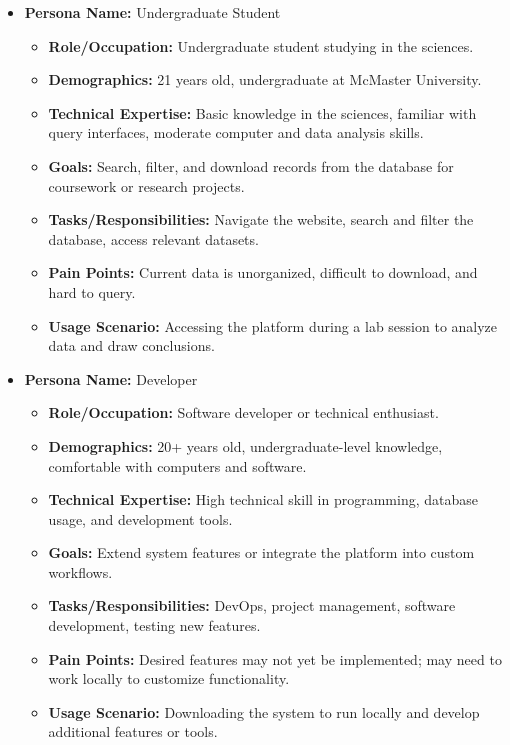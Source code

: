 \documentclass[12pt]{article}
\begin{document}
\begin{itemize}
    \item \textbf{Persona Name:} Undergraduate Student
    \begin{itemize}
        \item \textbf{Role/Occupation:} Undergraduate student studying in the sciences.
        \item \textbf{Demographics:} 21 years old, undergraduate at McMaster University.
        \item \textbf{Technical Expertise:} Basic knowledge in the sciences, familiar with query interfaces, moderate computer and data analysis skills.
        \item \textbf{Goals:} Search, filter, and download records from the database for coursework or research projects.
        \item \textbf{Tasks/Responsibilities:} Navigate the website, search and filter the database, access relevant datasets.
        \item \textbf{Pain Points:} Current data is unorganized, difficult to download, and hard to query.
        \item \textbf{Usage Scenario:} Accessing the platform during a lab session to analyze data and draw conclusions.
    \end{itemize}

    \item \textbf{Persona Name:} Developer
    \begin{itemize}
        \item \textbf{Role/Occupation:} Software developer or technical enthusiast.
        \item \textbf{Demographics:} 20+ years old, undergraduate-level knowledge, comfortable with computers and software.
        \item \textbf{Technical Expertise:} High technical skill in programming, database usage, and development tools.
        \item \textbf{Goals:} Extend system features or integrate the platform into custom workflows.
        \item \textbf{Tasks/Responsibilities:} DevOps, project management, software development, testing new features.
        \item \textbf{Pain Points:} Desired features may not yet be implemented; may need to work locally to customize functionality.
        \item \textbf{Usage Scenario:} Downloading the system to run locally and develop additional features or tools.
    \end{itemize}


\end{itemize}
\end{document}
